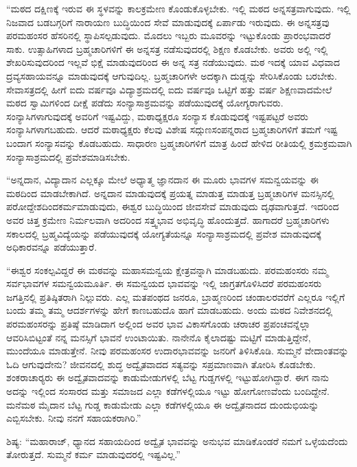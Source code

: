  “ಮಠದ ದಕ್ಷಿಣಕ್ಕೆ ಇರುವ ಈ ಸ್ಥಳವನ್ನು ಕಾಲಕ್ರಮೇಣ ಕೊಂಡುಕೊಳ್ಳಬೇಕು. ಇಲ್ಲಿ ಮಠದ ಅನ್ನಸತ್ರವಾಗುವುದು. ಇಲ್ಲಿ ನಿಜವಾದ ಬಡಬಗ್ಗರಿಗೆ ನಾರಾಯಣ ಬುದ್ಧಿಯಿಂದ ಸೇವೆ ಮಾಡುವುದಕ್ಕೆ ಏರ್ಪಾಡು ಇರುವುದು. ಈ ಅನ್ನಸತ್ರವು ಪರಮಹಂಸರ ಹೆಸರಿನಲ್ಲಿ ಸ್ಥಾಪಿಸಲ್ಪಡುವುದು. ಮೊದಲು ಇಬ್ಬರು ಮೂವರನ್ನು ಇಟ್ಟುಕೊಂಡು ಪ್ರಾರಂಭವಾದರೆ ಸಾಕು. ಉತ್ಸಾಹಿಗಳಾದ ಬ್ರಹ್ಮಚಾರಿಗಳಿಗೆ ಈ ಅನ್ನಸತ್ರ ನಡೆಸುವುದರಲ್ಲಿ ಶಿಕ್ಷಣ ಕೊಡಬೇಕು. ಅವರು ಅಲ್ಲಿ ಇಲ್ಲಿ ಶೇಖರಿಸುವುದರಿಂದ ಇಲ್ಲವೆ ಭಿಕ್ಷೆ ಮಾಡುವುದರಿಂದ ಈ ಅನ್ನ ಸತ್ರ ನಡೆಯುವುದು. ಮಠ ಇದಕ್ಕೆ ಯಾವ ವಿಧವಾದ ದ್ರವ್ಯಸಹಾಯವನ್ನೂ ಮಾಡುವುದಕ್ಕೆ ಆಗುವುದಿಲ್ಲ. ಬ್ರಹ್ಮಚಾರಿಗಳೇ ಅದಕ್ಕಾಗಿ ದುಡ್ಡನ್ನು ಸೇರಿಸಿಕೊಂಡು ಬರಬೇಕು. ಸೇವಾಸತ್ರದಲ್ಲಿ ಹೀಗೆ ಐದು ವರ್ಷವೂ ವಿದ್ಯಾಶ್ರಮದಲ್ಲಿ ಐದು ವರ್ಷವೂ ಒಟ್ಟಿಗೆ ಹತ್ತು ವರ್ಷ ಶಿಕ್ಷಣವಾದಮೇಲೆ ಮಠದ ಸ್ವಾಮಿಗಳಿಂದ ದೀಕ್ಷೆ ಪಡೆದು ಸಂನ್ಯಾಸಾಶ್ರಮವನ್ನು ಪಡೆಯುವುದಕ್ಕೆ ಯೋಗ್ಯರಾಗುವರು. ಸಂನ್ಯಾಸಿಗಳಾಗುವುದಕ್ಕೆ ಅವರಿಗೆ ಇಷ್ಟವಿದ್ದು, ಮಠಾಧ್ಯಕ್ಷರೂ ಸಂನ್ಯಾಸ ಕೊಡುವುದಕ್ಕೆ ಇಷ್ಟಪಟ್ಟರೆ ಅವರು ಸಂನ್ಯಾಸಿಗಳಾಗಬಹುದು. ಆದರೆ ಮಠಾಧ್ಯಕ್ಷರು ಕೆಲವು ವಿಶೇಷ ಸದ್ಗುಣಸಂಪನ್ನರಾದ ಬ್ರಹ್ಮಚಾರಿಗಳಿಗೆ ತಮಗೆ ಇಷ್ಟ ಬಂದಾಗ ಸಂನ್ಯಾಸವನ್ನು ಕೊಡಬಹುದು. ಸಾಧಾರಣ ಬ್ರಹ್ಮಚಾರಿಗಳಿಗೆ ಮಾತ್ರ ಹಿಂದೆ ಹೇಳಿದ ರೀತಿಯಲ್ಲಿ ಕ್ರಮಕ್ರಮವಾಗಿ ಸಂನ್ಯಾಸಾಶ್ರಮದಲ್ಲಿ ಪ್ರವೇಶಮಾಡಿಸಬೇಕು. 

 “ಅನ್ನದಾನ, ವಿದ್ಯಾದಾನ ಎಲ್ಲಕ್ಕೂ ಮೇಲೆ ಅಧ್ಯಾತ್ಮ ಜ್ಞಾನದಾನ ಈ ಮೂರು ಭಾವಗಳ ಸಮನ್ವಯವನ್ನು ಈ ಮಠದಿಂದ ಮಾಡಬೇಕಾಗಿದೆ. ಅನ್ನದಾನ ಮಾಡುವುದಕ್ಕೆ ಪ್ರಯತ್ನ ಮಾಡುತ್ತ ಮಾಡುತ್ತ ಬ್ರಹ್ಮಚಾರಿಗಳ ಮನಸ್ಸಿನಲ್ಲಿ ಪರೋದ್ದೇಶದಿಂದ\break ಕರ್ಮಮಾಡುವುದು, ಈಶ್ವರ ಬುದ್ಧಿಯಿಂದ ಜೀವಸೇವೆ ಮಾಡುವುದು ದೃಢವಾಗುತ್ತದೆ. ಇದರಿಂದ ಅವರ ಚಿತ್ತ ಕ್ರಮೇಣ ನಿರ್ಮಲವಾಗಿ ಅದರಿಂದ ಸತ್ತ್ವಭಾವ ಅಭಿವೃದ್ಧಿ ಹೊಂದುತ್ತದೆ. ಹಾಗಾದರೆ ಬ್ರಹ್ಮಚಾರಿಗಳು ಸಕಾಲದಲ್ಲಿ ಬ್ರಹ್ಮವಿದ್ಯೆಯನ್ನು ಪಡೆಯುವುದಕ್ಕೆ ಯೋಗ್ಯತೆಯನ್ನೂ ಸಂನ್ಯಾಸಾಶ್ರಮದಲ್ಲಿ ಪ್ರವೇಶ ಮಾಡುವುದಕ್ಕೆ ಅಧಿಕಾರವನ್ನೂ ಪಡೆಯುತ್ತಾರೆ. 

 “ಈಶ್ವರ ಸಂಕಲ್ಪವಿದ್ದರೆ ಈ ಮಠವನ್ನು ಮಹಾಸಮನ್ವಯ ಕ್ಷೇತ್ರವನ್ನಾಗಿ ಮಾಡಬಹುದು. ಪರಮಹಂಸರು ನಮ್ಮ ಸರ್ವಭಾವಗಳ ಸಮನ್ವಯಮೂರ್ತಿ. ಈ ಸಮನ್ವಯದ ಭಾವವನ್ನು ಇಲ್ಲಿ ಜಾಗ್ರತಗೊಳಿಸಿದರೆ ಪರಮಹಂಸರು ಜಗತ್ತಿನಲ್ಲಿ ಪ್ರತಿಷ್ಠಿತರಾಗಿ ನಿಲ್ಲುವರು. ಎಲ್ಲ ಮತಪಂಥದ ಜನರೂ, ಬ್ರಾಹ್ಮಣರಿಂದ ಚಂಡಾಲರವರೆಗೆ ಎಲ್ಲರೂ ಇಲ್ಲಿಗೆ ಬಂದು ತಮ್ಮ ತಮ್ಮ ಆದರ್ಶಗಳನ್ನು ಹೇಗೆ ಕಾಣಬಹುದೊ ಹಾಗೆ ಮಾಡಬಹುದು. ಅಂದು ಮಠದ ನಿವೇಶನದಲ್ಲಿ ಪರಮಹಂಸರನ್ನು ಪ್ರತಿಷ್ಠೆ ಮಾಡಿದಾಗ ಅಲ್ಲಿಂದ ಅವರ ಭಾವ ವಿಕಾಸಗೊಂಡು ಚರಾಚರ ಪ್ರಪಂಚವನ್ನೆಲ್ಲಾ ಆವರಿಸಿಬಿಟ್ಟಂತೆ ನನ್ನ ಮನಸ್ಸಿಗೆ ಭಾವನೆ ಉಂಟಾಯಿತು. ನಾನೇನೊ ಕೈಲಾದಷ್ಟು ಮಟ್ಟಿಗೆ ಮಾಡುತ್ತಿದ್ದೇನೆ, ಮುಂದೆಯೂ ಮಾಡುತ್ತೇನೆ. ನೀವು ಪರಮಹಂಸರ ಉದಾರಭಾವವನ್ನು ಜನರಿಗೆ ತಿಳಿಸಿಕೊಡಿ. ಸುಮ್ಮನೆ ವೇದಾಂತವನ್ನು ಓದಿ ಆಗುವುದೇನು? ಜೀವನದಲ್ಲಿ ಶುದ್ಧ ಅದ್ವೈತವಾದದ ಸತ್ಯವನ್ನು ಸಪ್ರಮಾಣವಾಗಿ ತೋರಿಸಿ ಕೊಡಬೇಕು. ಶಂಕರಾಚಾರ‍್ಯರು ಈ ಅದ್ವೈತವಾದವನ್ನು ಕಾಡುಮೇಡುಗಳಲ್ಲಿ ಬೆಟ್ಟ ಗುಡ್ಡಗಳಲ್ಲಿ ಇಟ್ಟುಹೋಗಿದ್ದಾರೆ. ಈಗ ನಾನು ಅದನ್ನು ಇಲ್ಲಿಂದ ಸಂಸಾರದ ಮತ್ತು ಸಮಾಜದ ಎಲ್ಲಾ ಕಡೆಗಳಲ್ಲಿಯೂ ಇಟ್ಟು ಹೋಗೋಣವೆಂದು ಬಂದಿದ್ದೇನೆ. ಮನೆಮಠ ಮೈದಾನ ಬೆಟ್ಟ ಗುಡ್ಡ ಕಾಡುಮೇಡು ಎಲ್ಲಾ ಕಡೆಗಳಲ್ಲಿಯೂ ಈ ಅದ್ವೈತನಾದದ ದುಂದುಭಿಯನ್ನು ಎಬ್ಬಿಸಬೇಕು. ನೀವು ನನಗೆ ಸಹಾಯಕರಾಗಿರಿ.” 

 ಶಿಷ್ಯ: “ಮಹಾರಾಜ್, ಧ್ಯಾನದ ಸಹಾಯದಿಂದ ಅದ್ವೈತ ಭಾವವನ್ನು ಅನುಭವ ಮಾಡಿಕೊಂಡರೆ ನಮಗೆ ಒಳ್ಳೆಯದೆಂದು ತೋರುತ್ತದೆ. ಸುಮ್ಮನೆ ಕರ್ಮ ಮಾಡುವುದರಲ್ಲಿ ಇಷ್ಟವಿಲ್ಲ.” 

